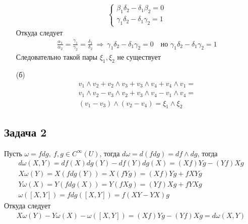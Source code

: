 \begin{enumerate}
\begin{gather*}
\begin{cases}
			\beta_1 \delta_2 - \delta_1 \beta_2 = 0\\
			\gamma_1 \delta_2 - \delta_1 \gamma_2 = 1
		\end{cases}
	\end{gather*}
	Откуда следует
	\begin{gather*}
		\frac{\alpha_1}{\alpha_2} = \frac{\gamma_1}{\gamma_2} = \frac{\delta_1}{\delta_2}\ \Rightarrow\ \gamma_1 \delta_2 - \delta_1 \gamma_2 = 0\quad \text{но } \gamma_1 \delta_2 - \delta_1 \gamma_2 = 1
	\end{gather*}
	Следовательно такой пары $\xi_1, \xi_2$ не существует
\item[(б)]
	\begin{gather*}
		v_1 \wedge v_2 + v_2 \wedge v_3 + v_3 \wedge v_4 + v_4 \wedge v_1 =\\
		v_1 \wedge v_2 - v_3 \wedge v_2 + v_3 \wedge v_4 - v_1 \wedge v_4 =\\
		(v_1 - v_3) \wedge (v_2 - v_4) = 
		\xi_1 \wedge \xi_2
	\end{gather*}
\end{enumerate}
\vskip 0.4in


\subsection*{Задача 2}
	Пусть $\omega = fdg,\ f,g \in C^{\infty}(U)$, тогда $d \omega = d(fdg) = df \wedge dg$, тогда
	\begin{gather*}
	d \omega (X,Y) = df(X)dg(Y) - df(Y)dg(X) = (Xf)Yg - (Yf)Xg\\
	X \omega (Y) = X(fdg(Y)) = X(fYg) = (Xf)Yg + fXYg\\
	Y \omega (X) = Y(fdg(X)) = Y(fXg) = (Yf)Xg + fYXg\\
	\omega ([X,Y]) = fdg([X,Y]) = f(XY - YX)g
	\end{gather*}
	Откуда следует
	\begin{gather*}
	X \omega (Y) - Y \omega (X) - \omega ([X,Y]) = (Xf)Yg - (Yf)Xg = d \omega (X,Y)
	\end{gather*}
\vskip 0.4in
\begin{comment}
	\begin{gather*}
	(dw)(X_0,\ldots,X_n) = \sum\limits_{i=0}^{n} (-1)^i X_i (w(X_0,\ldots,\hat{X}_i,\ldots,X_n)) +\\
	\sum\limits_{0 \leqslant i < j \leqslant n} (-1)^{i+j}w([X_i,X_j],X_0,\ldots,\hat{X}_i,\ldots,\hat{X}_j,\ldots,X_n)
	\end{gather*}
	Тогда
	\begin{gather*}
	dw(X,Y) = (i_X dw)(Y) = (L_X w)(Y) - (dw(X))(Y)
	\end{gather*}
	И так как $L_X$ коммутирует с сжимающим оператором,то
	\begin{gather*}
	Xw(Y) = L_X(w(Y)) = (L_X w)(Y) + w([X,Y])\ \Leftrightarrow\ (L_X w)(Y) = Xw(Y) - w([X,Y])
	\end{gather*}
	Тогда
	\begin{gather*}
	dw(X,Y) = Xw(Y) - w([X,Y]) - (dw(X))(Y) = Xw(Y) - Yw(X) - w([X,Y])
	\end{gather*}
\end{comment}


